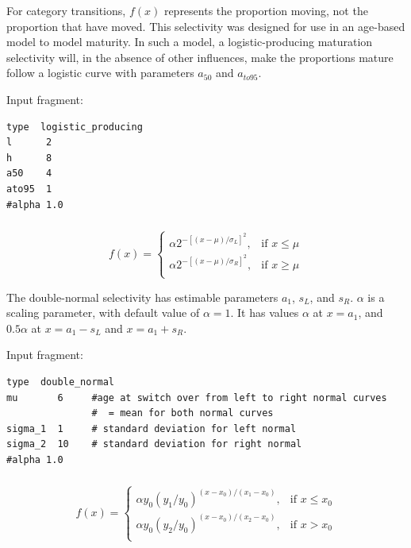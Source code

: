 For category transitions, $f(x)$ represents the proportion moving, not the proportion that have moved. This selectivity was designed for use in an age-based model to model maturity. In such a model, a logistic-producing maturation selectivity will, in the absence of other influences, make the proportions mature follow a logistic curve with parameters $a_{50}$ and $a_{to95}$.

Input fragment: {\small{\begin{verbatim}
type  logistic_producing
l      2
h      8
a50    4
ato95  1
#alpha 1.0
\end{verbatim}}}

\subsubsection[Double-normal]{}

\begin{equation}
  f(x) = \begin{cases}
    \alpha 2^{-[(x- \mu)/\sigma_L ]^2}, & \text{if $x \leq \mu$} \\
    \alpha 2^{-[(x- \mu)/\sigma_R ]^2}, & \text{if $x \ge \mu$}\\
  \end{cases}
\end{equation}

The double-normal selectivity has estimable parameters $a_1$, $s_L$, and $s_R$. $\alpha$ is a scaling parameter, with default value of $\alpha = 1$. It has values $\alpha$ at $x=a_1$, and $0.5 \alpha$ at $x=a_1-s_L$ and $x=a_1+s_R$.

Input fragment: {\small{\begin{verbatim}
type  double_normal
mu       6     #age at switch over from left to right normal curves
               #  = mean for both normal curves
sigma_1  1     # standard deviation for left normal
sigma_2  10    # standard deviation for right normal
#alpha 1.0
\end{verbatim}}}

\subsubsection[Double-exponential]{}

\begin{equation}
f(x)=\begin{cases}
	  \alpha y_0(y_1 / y_0)^{(x-x_0)/(x_1-x_0)}, & \text{if $x \le x_0$} \\
	  \alpha y_0(y_2 / y_0)^{(x-x_0)/(x_2-x_0)}, & \text{if $x > x_0$} \\
  \end{cases}
\end{equation}

